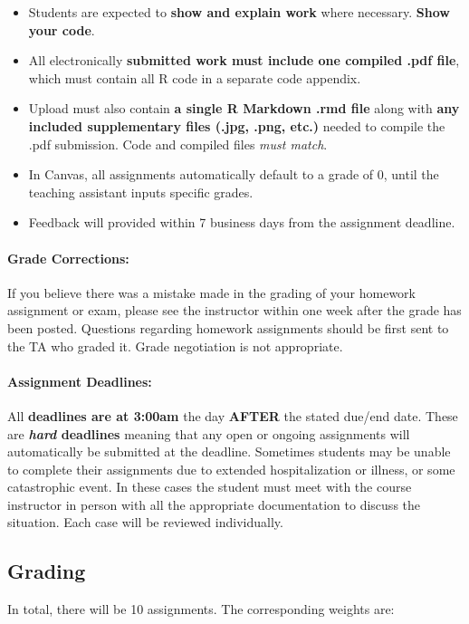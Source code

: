 \documentclass[11pt]{article}
\begin{document}
	
\begin{itemize}
	\item Students are expected to \textbf{show and explain work} where necessary. \textbf{Show your code}.
	\item All electronically \textbf{submitted work must include one compiled .pdf file}, which must contain all R code in a separate code appendix.
	\item Upload must also contain \textbf{a single R Markdown .rmd file} along with \textbf{any included supplementary files (.jpg, .png, etc.)} needed to compile the .pdf submission. Code and compiled files \emph{must match}.
	\item In Canvas, all assignments automatically default to a grade of 0, until the teaching assistant inputs specific grades.
	\item Feedback will provided within 7 business days from the assignment deadline.
\end{itemize}
	
\paragraph{Grade Corrections:}
If you believe there was a mistake made in the grading of your homework assignment or exam, please see the instructor within one week after the grade has been posted. Questions regarding homework assignments should be first sent to the TA who graded it. Grade negotiation is not appropriate.
	
\paragraph{Assignment Deadlines:}
All \textbf{deadlines are at 3:00am} the day \textbf{AFTER} the stated due/end date.  These are \textbf{\emph{hard} deadlines} meaning that any open or ongoing assignments will automatically be submitted at the deadline. Sometimes students may be unable to complete their assignments due to extended hospitalization or illness, or some catastrophic event. In these cases the student must meet with the course instructor in person with all the appropriate documentation to discuss the situation. Each case will be reviewed individually. 

\pagebreak

\subsection*{Grading}
In total, there will be 10 assignments.  The corresponding weights are: 
\end{document}
